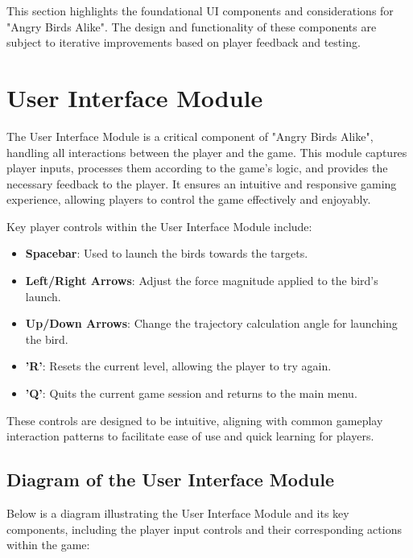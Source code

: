 \documentclass[12pt]{article}
\begin{document}
This section highlights the foundational UI components and considerations for "Angry Birds Alike". The design and functionality of these components are subject to iterative improvements based on player feedback and testing.

\section{User Interface Module}
The User Interface Module is a critical component of "Angry Birds Alike", handling all interactions between the player and the game. This module captures player inputs, processes them according to the game's logic, and provides the necessary feedback to the player. It ensures an intuitive and responsive gaming experience, allowing players to control the game effectively and enjoyably.

Key player controls within the User Interface Module include:
\begin{itemize}
    \item \textbf{Spacebar}: Used to launch the birds towards the targets.
    \item \textbf{Left/Right Arrows}: Adjust the force magnitude applied to the bird's launch.
    \item \textbf{Up/Down Arrows}: Change the trajectory calculation angle for launching the bird.
    \item \textbf{'R'}: Resets the current level, allowing the player to try again.
    \item \textbf{'Q'}: Quits the current game session and returns to the main menu.
\end{itemize}

These controls are designed to be intuitive, aligning with common gameplay interaction patterns to facilitate ease of use and quick learning for players.

\subsection{Diagram of the User Interface Module}
Below is a diagram illustrating the User Interface Module and its key components, including the player input controls and their corresponding actions within the game:
\end{document}
